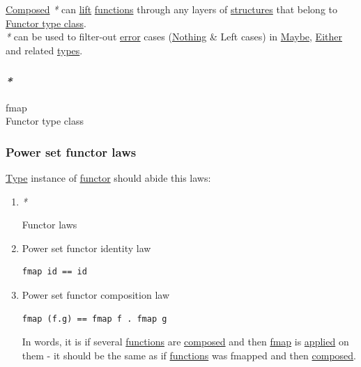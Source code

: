 \documentclass[a4paper,14pt,oneside]{book}
\begin{document}
\hyperref[org4c4e70a]{Composed} \emph{*} can \hyperref[orgfa55ee9]{lift} \hyperref[org0bd6046]{functions} through any layers of \hyperref[org5ea44de]{structures} that belong to \hyperref[org9dbca7b]{Functor type class}.\\

\emph{*} can be used to filter-out \hyperref[org9c3672b]{error} cases (\hyperref[org9ba77f5]{Nothing} \& Left cases) in \hyperref[orga9bddfc]{Maybe}, \hyperref[org260eea7]{Either} and related \hyperref[org9e7edc9]{types}.\\

\subsubsection{\emph{*}}
\label{sec:org02145d5}

\label{orgf4710da}fmap\\
\label{org9dbca7b}Functor type class\\

\subsubsection{\label{org53dea26}Power set functor laws}
\label{sec:orgee90b02}
\hyperref[orgd6db20c]{Type} instance of \hyperref[orge5e236e]{functor} should abide this laws:\\

\begin{enumerate}
\item \emph{*}
\label{sec:org8805ade}

\label{org4e8105b}Functor laws\\

\item \label{orgadfd1cd}Power set functor identity law
\label{sec:orgdc06a56}
\begin{verbatim}
fmap id == id
\end{verbatim}

\item \label{org9f5dda6}Power set functor composition law
\label{sec:org727f901}
\begin{verbatim}
fmap (f.g) == fmap f . fmap g
\end{verbatim}
In words, it is if several \hyperref[org0bd6046]{functions} are \hyperref[org4c4e70a]{composed} and then \hyperref[orgf4710da]{fmap} is \hyperref[orgddce002]{applied} on them - it should be the same as if \hyperref[org0bd6046]{functions} was fmapped and then \hyperref[org4c4e70a]{composed}.\\
\end{enumerate}
\end{document}
